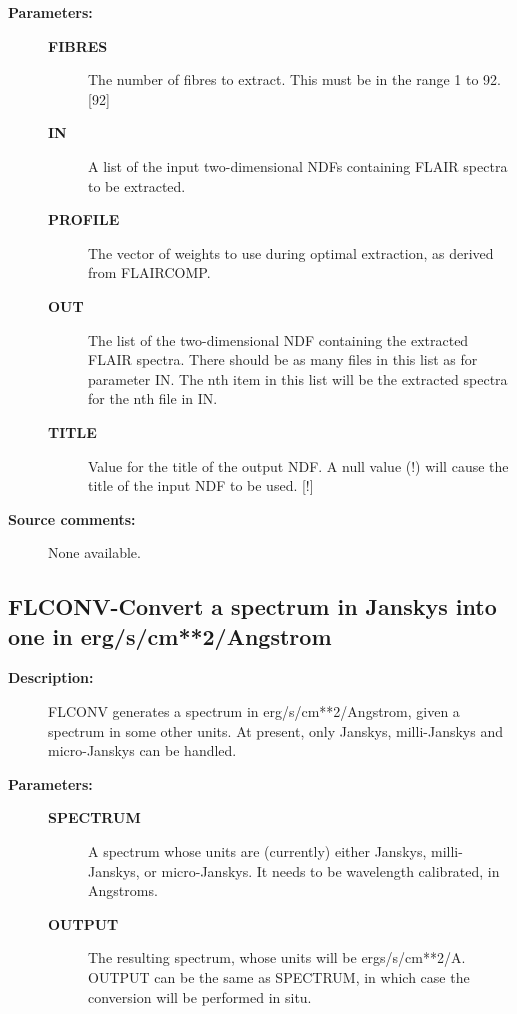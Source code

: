 \begin{description}
\begin{description}
\item [\textbf{Parameters:}]
\begin{description}
\item [\textbf{FIBRES}]
 The number of fibres to extract.  This must be in the range
 1 to 92. [92]
\item [\textbf{IN}]
 A list of the input two-dimensional NDFs containing FLAIR
 spectra to be extracted.
\item [\textbf{PROFILE}]
 The vector of weights to use during optimal extraction, as
 derived from FLAIRCOMP.
\item [\textbf{OUT}]
 The list of the two-dimensional NDF containing the extracted
 FLAIR spectra.  There should be as many files in this list as
 for parameter IN.  The nth item in this list will be the
 extracted spectra for the nth file in IN.
\item [\textbf{TITLE}]
 Value for the title of the output NDF.  A null value (!) will
 cause the title of the input NDF to be used. [!]

\end{description}

\item [\textbf{Source comments:}]
\begin{terminalv}
 None available.

\end{terminalv}
\end{description}
\subsection{FLCONV-\label{FLCONV}Convert a spectrum in
Janskys into one in erg/s/cm**2/Angstrom}
\begin{description}

\item [\textbf{Description:}]
 FLCONV generates a spectrum in erg/s/cm**2/Angstrom, given a spectrum
 in some other units.  At present, only Janskys, milli-Janskys and
 micro-Janskys can be handled.

\item [\textbf{Parameters:}]
\begin{description}
\item [\textbf{SPECTRUM}]
 A spectrum whose units are (currently) either
 Janskys, milli-Janskys, or micro-Janskys.  It
 needs to be wavelength calibrated, in Angstroms.
\item [\textbf{OUTPUT}]
 The resulting spectrum, whose units will be ergs/s/cm**2/A.
 OUTPUT can be the same as SPECTRUM, in which case the
 conversion will be performed in situ.
\end{description}


\end{description}
\end{description}
